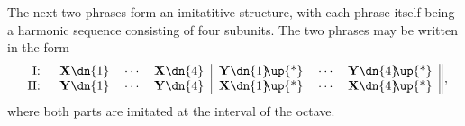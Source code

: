 \begin{example}[\bwv{933}]
The next two phrases form an imitatitive structure, with each phrase itself being a harmonic sequence consisting of four subunits. The two phrases may be written in the form
\begin{equation*}
\begin{tabular}{rccc|ccc||}
I: \quad & \textbf{X}\dn{1} &  $\cdots$\! & \textbf{X}\dn{4} & \textbf{Y}\dn{1}\!\!\up{*} &  $\cdots$\! & \textbf{Y}\dn{4}\!\!\up{*} \\
II: \quad & \textbf{Y}\dn{1} &  $\cdots$\! & \textbf{Y}\dn{4} & \textbf{X}\dn{1}\!\!\up{*} &  $\cdots$\! & \textbf{X}\dn{4}\!\!\up{*}\\
\end{tabular} \, ,
\end{equation*}
where both parts are imitated at the interval of the octave. 

\end{example}
